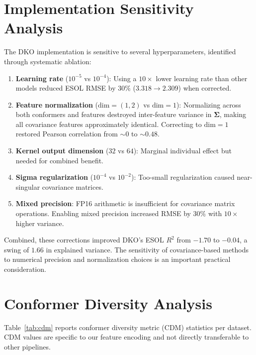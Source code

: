 \documentclass[sigconf]{acmart}
\begin{document}
\section{Implementation Sensitivity Analysis}
\label{app:impl}

The DKO implementation is sensitive to several hyperparameters, identified through systematic ablation:

\begin{enumerate}
    \item \textbf{Learning rate} ($10^{-5}$ vs $10^{-4}$): Using a $10\times$ lower learning rate than other models reduced ESOL RMSE by $30\%$ ($3.318 \to 2.309$) when corrected.
    \item \textbf{Feature normalization} ($\text{dim}{=}(1,2)$ vs $\text{dim}{=}1$): Normalizing across both conformers and features destroyed inter-feature variance in $\boldsymbol{\Sigma}$, making all covariance features approximately identical. Correcting to $\text{dim}{=}1$ restored Pearson correlation from ${\sim}0$ to ${\sim}0.48$.
    \item \textbf{Kernel output dimension} ($32$ vs $64$): Marginal individual effect but needed for combined benefit.
    \item \textbf{Sigma regularization} ($10^{-4}$ vs $10^{-2}$): Too-small regularization caused near-singular covariance matrices.
    \item \textbf{Mixed precision}: FP16 arithmetic is insufficient for covariance matrix operations. Enabling mixed precision increased RMSE by $30\%$ with $10\times$ higher variance.
\end{enumerate}

Combined, these corrections improved DKO's ESOL $R^2$ from $-1.70$ to $-0.04$, a swing of $1.66$ in explained variance. The sensitivity of covariance-based methods to numerical precision and normalization choices is an important practical consideration.

\section{Conformer Diversity Analysis}
\label{app:cdm}

Table~\ref{tab:cdm} reports conformer diversity metric (CDM) statistics per dataset. CDM values are specific to our feature encoding and not directly transferable to other pipelines.
\end{document}
